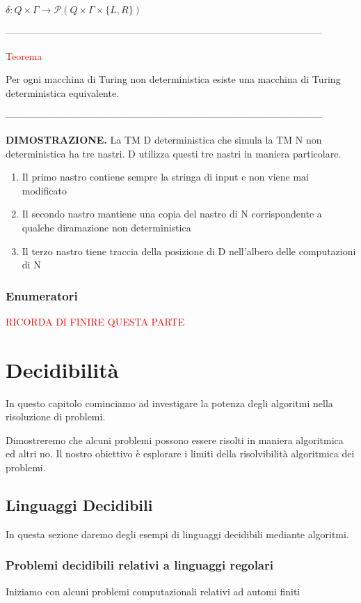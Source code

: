 \documentclass{article}
\begin{document}
\begin{center}
    $\delta: Q \times \Gamma \rightarrow \mathcal{P}(Q \times \Gamma \times \{L,
    R\})$
\end{center}

--------------------------------------------------------------------------------------------------

\begin{center}
    \textcolor{red}{Teorema}
\end{center}

Per ogni macchina di Turing non deterministica esiste una macchina di Turing
deterministica equivalente.

--------------------------------------------------------------------------------------------------

\textbf{DIMOSTRAZIONE.}  La TM D deterministica che simula la TM N non
deterministica ha tre nastri. D utilizza questi tre nastri in maniera
particolare.

\begin{enumerate}
    \item Il primo nastro contiene sempre la stringa di input e non viene mai
    modificato
    \item Il secondo nastro mantiene una copia del nastro di N corrispondente a
    qualche diramazione non deterministica
    \item Il terzo nastro tiene traccia della posizione di D nell'albero delle
    computazioni di N
\end{enumerate}

\subsubsection{Enumeratori}

\textcolor{red}{RICORDA DI FINIRE QUESTA PARTE}

\section{Decidibilità}

In questo capitolo cominciamo ad investigare la potenza degli algoritmi nella
risoluzione di problemi.

Dimostreremo che alcuni problemi possono essere risolti in maniera algoritmica
ed altri no. Il nostro obiettivo è esplorare i limiti della risolvibilità
algoritmica dei problemi. 

\subsection{Linguaggi Decidibili}

In questa sezione daremo degli esempi di linguaggi decidibili mediante
algoritmi.

\subsubsection{Problemi decidibili relativi a linguaggi regolari}

Iniziamo con alcuni problemi computazionali relativi ad automi finiti
\end{document}
